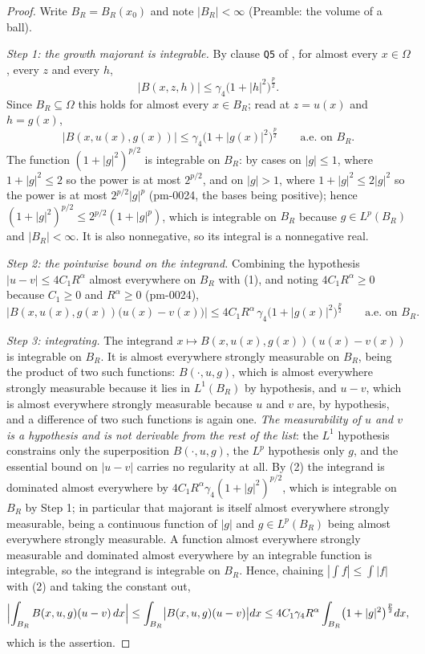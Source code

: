 \begin{proof}
Write $B_R=B_R(x_0)$ and note $|B_R|<\infty$ (Preamble: the volume of a ball).

\emph{Step 1: the growth majorant is integrable.}  By clause \texttt{Q5} of
, for almost every $x\in\Omega$, every $z$ and
every $h$,
\[
\bigl|B(x,z,h)\bigr|\le\gamma_4\bigl(1+|h|^2\bigr)^{\frac p2} .
\]
Since $B_R\subseteq\Omega$ this holds for almost every $x\in B_R$; read at
$z=u(x)$ and $h=g(x)$,
\[
\bigl|B(x,u(x),g(x))\bigr|\le\gamma_4\bigl(1+|g(x)|^2\bigr)^{\frac p2}
\qquad\text{a.e. on }B_R .
\tag{1}
\]
The function $(1+|g|^2)^{p/2}$ is integrable on $B_R$: by cases on $|g|\le1$,
where $1+|g|^2\le2$ so the power is at most $2^{p/2}$, and on $|g|>1$, where
$1+|g|^2\le2|g|^2$ so the power is at most $2^{p/2}|g|^p$ (pm-0024, the bases
being positive); hence
$(1+|g|^2)^{p/2}\le2^{p/2}(1+|g|^p)$, which is integrable on $B_R$ because
$g\in L^p(B_R)$ and $|B_R|<\infty$.  It is also nonnegative, so its integral is
a nonnegative real.

\emph{Step 2: the pointwise bound on the integrand.}  Combining the hypothesis
$|u-v|\le4C_1R^{\alpha}$ almost everywhere on $B_R$ with (1), and noting
$4C_1R^{\alpha}\ge0$ because $C_1\ge0$ and $R^{\alpha}\ge0$ (pm-0024),
\[
\bigl|B(x,u(x),g(x))\bigl(u(x)-v(x)\bigr)\bigr|
\le4C_1R^{\alpha}\,\gamma_4\bigl(1+|g(x)|^2\bigr)^{\frac p2}
\qquad\text{a.e. on }B_R .
\tag{2}
\]

\emph{Step 3: integrating.}  The integrand
$x\mapsto B(x,u(x),g(x))(u(x)-v(x))$ is integrable on $B_R$.  It is almost
everywhere strongly measurable on $B_R$, being the product of two such
functions: $B(\cdot,u,g)$, which is almost everywhere strongly measurable
because it lies in $L^1(B_R)$ by hypothesis, and $u-v$, which is almost
everywhere strongly measurable because $u$ and $v$ are, by hypothesis, and a
difference of two such functions is again one.  \emph{The measurability of $u$
and $v$ is a hypothesis and is not derivable from the rest of the list}: the
$L^1$ hypothesis constrains only the superposition $B(\cdot,u,g)$, the $L^p$
hypothesis only $g$, and the essential bound on $|u-v|$ carries no regularity
at all.  By (2) the integrand is dominated almost everywhere by
$4C_1R^{\alpha}\gamma_4(1+|g|^2)^{p/2}$, which is integrable on $B_R$ by Step
1; in particular that majorant is itself almost everywhere strongly measurable,
being a continuous function of $|g|$ and $g\in L^p(B_R)$ being almost
everywhere strongly measurable.  A function almost everywhere strongly
measurable and dominated almost everywhere by an integrable function is
integrable, so the integrand is integrable on $B_R$.  Hence, chaining
$|\int f|\le\int|f|$ with (2) and taking the constant out,
\[
\Bigl|\int_{B_R}B(x,u,g)(u-v)\,dx\Bigr|
\le\int_{B_R}\bigl|B(x,u,g)(u-v)\bigr|dx
\le4C_1\gamma_4R^{\alpha}\int_{B_R}\bigl(1+|g|^2\bigr)^{\frac p2}dx ,
\]
which is the assertion.


\end{proof}
